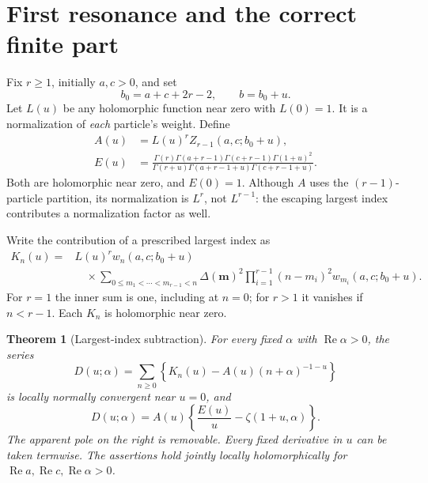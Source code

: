 \documentclass[11pt,letterpaper]{article}
\numberwithin{equation}{section}
\newtheorem{theorem}{Theorem}[section]
\theoremstyle{definition}\newtheorem{definition}[theorem]{Definition}
\theoremstyle{remark}\newtheorem{remark}[theorem]{Remark}
\DeclareMathOperator{\Rea}{Re}
\begin{document}

\section{First resonance and the correct finite part}
\label{dhr:sec:resonance}

Fix $r\geq1$, initially $a,c>0$, and set
\begin{equation}\label{dhr:eq:resonant-parameters}
 b_0=a+c+2r-2,\qquad b=b_0+u.
\end{equation}
Let $L(u)$ be any holomorphic function near zero with $L(0)=1$.
It is a normalization of \emph{each} particle's weight. Define
\begin{equation}\label{dhr:eq:amplitude-E}
 \begin{split}
 A(u)&=L(u)^r Z_{r-1}(a,c;b_0+u),\\
 E(u)&=\frac{\Gamma(r)\Gamma(a+r-1)\Gamma(c+r-1)\Gamma(1+u)^2}
 {\Gamma(r+u)\Gamma(a+r-1+u)\Gamma(c+r-1+u)}.
 \end{split}
\end{equation}
Both are holomorphic near zero, and $E(0)=1$. Although $A$ uses the
$(r-1)$-particle partition, its normalization is $L^r$, not $L^{r-1}$:
the escaping largest index contributes a normalization factor as well.

Write the contribution of a prescribed largest index as
\begin{equation}\label{dhr:eq:maximum-mass}
 \begin{split}
 K_n(u)={}&L(u)^r w_n(a,c;b_0+u)\\
 &\quad\times\sum_{0\leq m_1<\cdots<m_{r-1}<n}
 \Delta(\bm m)^2\prod_{i=1}^{r-1}
       (n-m_i)^2w_{m_i}(a,c;b_0+u).
 \end{split}
\end{equation}
For $r=1$ the inner sum is one, including at $n=0$; for $r>1$ it
vanishes if $n<r-1$. Each $K_n$ is holomorphic near zero.

\begin{theorem}[Largest-index subtraction]\label{dhr:thm:resonance}
For every fixed $\alpha$ with $\Rea\alpha>0$, the series
\begin{equation}\label{dhr:eq:D-def}
 D(u;\alpha)=\sum_{n\geq0}
 \left\{K_n(u)-A(u)(n+\alpha)^{-1-u}\right\}
\end{equation}
is locally normally convergent near $u=0$, and
\begin{equation}\label{dhr:eq:D-master}
 \boxed{D(u;\alpha)=A(u)
       \left\{\frac{E(u)}u-\zeta(1+u,\alpha)\right\}.}
\end{equation}
The apparent pole on the right is removable. Every fixed derivative
in $u$ can be taken termwise. The assertions hold jointly locally
holomorphically for $\Rea a,\Rea c,\Rea\alpha>0$.
\end{theorem}
\end{document}
